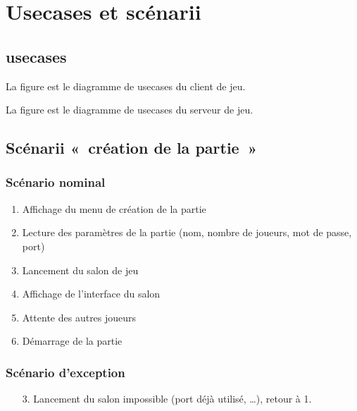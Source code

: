 \chapter{Usecases et scénarii}\label{chapter:usecases-and-scenarii}

\section{usecases}

La figure  est le diagramme de usecases du client de jeu.


La figure  est le diagramme de usecases du serveur de jeu.


\section{Scénarii « création de la partie »}

\subsection{Scénario nominal}
\begin{enumerate}
    \item Affichage du menu de création de la partie
    \item Lecture des paramètres de la partie (nom, nombre de joueurs, mot de passe, port)
    \item Lancement du salon de jeu
    \item Affichage de l'interface du salon
    \item Attente des autres joueurs
    \item Démarrage de la partie
\end{enumerate}

\subsection{Scénario d'exception}

\begin{itemize}
    \item[3.] Lancement du salon impossible (port déjà utilisé, …), retour à 1.
\end{itemize}

